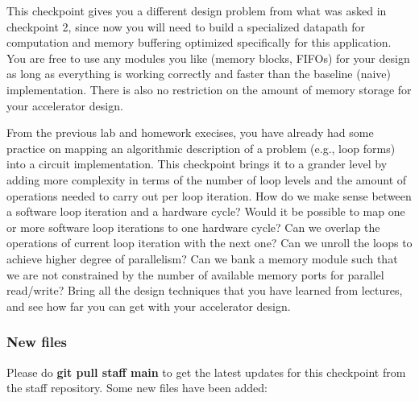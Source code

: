 \documentclass[11pt]{article}
\begin{document}
This checkpoint gives you a different design problem from what was asked in checkpoint 2, since now you will need to build a specialized datapath for computation and memory buffering optimized specifically for this application. You are free to use any modules you like (memory blocks, FIFOs) for your design as long as everything is working correctly and faster than the baseline (naive) implementation. There is also no restriction on the amount of memory storage for your accelerator design.

From the previous lab and homework execises, you have already had some practice on mapping an algorithmic description of a problem (e.g., loop forms) into a circuit implementation. This checkpoint brings it to a grander level by adding more complexity in terms of the number of loop levels and the amount of operations needed to carry out per loop iteration. How do we make sense between a software loop iteration and a hardware cycle? Would it be possible to map one or more software loop iterations to one hardware cycle? Can we overlap the operations of current loop iteration with the next one? Can we unroll the loops to achieve higher degree of parallelism? Can we bank a memory module such that we are not constrained by the number of available memory ports for parallel read/write? Bring all the design techniques that you have learned from lectures, and see how far you can get with your accelerator design.


\subsubsection{New files}
Please do \textbf{git pull staff main} to get the latest updates for this checkpoint from the staff repository. Some new files have been added:
\end{document}
